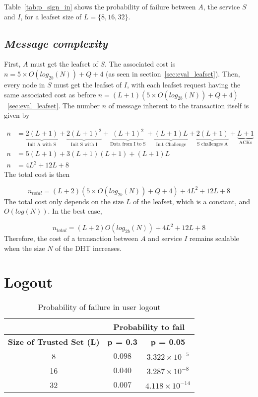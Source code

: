     Table~\eqref{tab:p_sign_in} shows the probability of failure
between $A$, the service $S$ and $I$, for a leafset size of $L = \{8,16,32\}$.

  \subsection{\textit{Message complexity}}
    First, $A$ must get the leafset of $S$. The associated cost is $n = 5
\times O(log_{2b}(N)) + Q + 4$ (as seen in section~\ref{sec:eval_leafset}).
Then, every node in $S$ must get the leafset of $I$, with each leafset request
having the same associated cost as before $n = (L+1)(5 \times O(log_{2b}(N)) + Q + 4)$~\ref{sec:eval_leafset}.
    The number $n$ of message inherent to the transaction itself is given by

    \begin{align}
      n &= \underbrace{2(L+1)}_\text{Init A with S} +
           \underbrace{2(L+1)^2}_\text{Init S with I} +
           \underbrace{(L+1)^2}_\text{Data from I to S} +
           \underbrace{(L+1)L}_\text{Init Challenge} +
           \underbrace{2(L+1)}_\text{S challenges A} +
           \underbrace{L+1}_\text{ACKs}\\
      n &= 5(L+1) + 3(L+1)(L+1)+ (L+1)L\\
      n &= 4L^2 +12L + 8 
    \end{align}
     The total cost is then

    $$
      n_{total} = (L +2)(5 \times O(log_{2b}(N)) + Q + 4) + 4L^2 +12L + 8 
    $$    
    The total cost only depends on the size $L$ of the leafset, which is a
constant, and $O(log(N))$. In the best case, 

    $$
      n_{total} = (L +2)O(log_{2b}(N)) + 4L^2 +12L + 8 
    $$
    Therefore, the cost of a transaction between $A$ and service $I$ remains
scalable when the size $N$ of the DHT increases.

\section{Logout}
  \label{sec:eval_logout}
  \begin{table}
    \centering
    \footnotesize
    \begin{tabular}{|c|c|c|}
      \cline{2-3}
      \multicolumn{1}{c|}{}&  \multicolumn{2}{c|}{\textbf{Probability to fail}} \\ \cline{2-3}
      \hline
      \textbf{Size of Trusted Set (L)} & \textbf{p = 0.3} & \textbf{p = 0.05} \\
      \hline \hline
      8 &  $0.098$ & $3.322 \times 10^{-5}$ \\
      \hline
      16 & $0.040$ & $3.287 \times 10^{-8}$  \\
      \hline
      32 & $0.007$ & $4.118 \times 10^{-14}$  \\
      \hline
    \end{tabular}
    \caption{Probability of failure in user logout}
    \label{tab:p_logout}
  \end{table}
  
